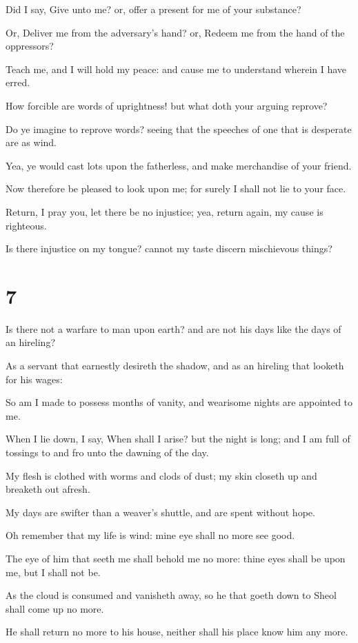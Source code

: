 \documentclass[12pt,oneside]{book}
\begin{document}
Did I say, Give unto me? or, offer a present for me of your substance?

Or, Deliver me from the adversary's hand? or, Redeem me from the hand of the oppressors?

Teach me, and I will hold my peace: and cause me to understand wherein I have erred.

How forcible are words of uprightness! but what doth your arguing reprove?

Do ye imagine to reprove words? seeing that the speeches of one that is desperate are as wind.

Yea, ye would cast lots upon the fatherless, and make merchandise of your friend.

Now therefore be pleased to look upon me; for surely I shall not lie to your face.

Return, I pray you, let there be no injustice; yea, return again, my cause is righteous.

Is there injustice on my tongue? cannot my taste discern mischievous things?

\chapter{7}
Is there not a warfare to man upon earth? and are not his days like the days of an hireling?

As a servant that earnestly desireth the shadow, and as an hireling that looketh for his wages:

So am I made to possess months of vanity, and wearisome nights are appointed to me.

When I lie down, I say, When shall I arise? but the night is long; and I am full of tossings to and fro unto the dawning of the day.

My flesh is clothed with worms and clods of dust; my skin closeth up and breaketh out afresh.

My days are swifter than a weaver's shuttle, and are spent without hope.

Oh remember that my life is wind: mine eye shall no more see good.

The eye of him that seeth me shall behold me no more: thine eyes shall be upon me, but I shall not be.

As the cloud is consumed and vanisheth away, so he that goeth down to Sheol shall come up no more.

He shall return no more to his house, neither shall his place know him any more.
\end{document}
